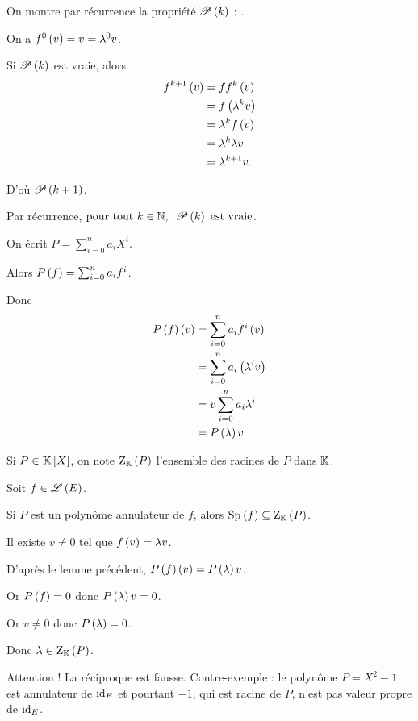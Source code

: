 \begin{dem}
On montre par récurrence la propriété \(\P{k}\) : .

On a \(f^0\paren{v}=v=\lambda^0v\).

Si \(\P{k}\) est vraie, alors \[\begin{aligned}f^{k+1}\paren{v}&=ff^k\paren{v} \\
&=f\paren{\lambda^kv} \\
&=\lambda^kf\paren{v} \\
&=\lambda^k\lambda v \\
&=\lambda^{k+1}v.
\end{aligned}\]

D'où \(\P{k+1}\).

Par récurrence, \(\quantifs{\tpt k\in\N}\P{k}\text{ est vraie}\).

On écrit \(P=\sum_{i=0}^na_iX^i\).

Alors \(P\paren{f}=\sum_{i=0}^na_if^i\).

Donc \[\begin{aligned}
P\paren{f}\paren{v}&=\sum_{i=0}^na_if^i\paren{v} \\
&=\sum_{i=0}^na_i\paren{\lambda^iv} \\
&=v\sum_{i=0}^na_i\lambda^i \\
&=P\paren{\lambda}v.
\end{aligned}\]
\end{dem}

Si \(P\in\poly\), on note \(\rac{P}\) l'ensemble des racines de \(P\) dans \(\K\).

\begin{prop}
Soit \(f\in\Lendo{E}\).

Si \(P\) est un polynôme annulateur de \(f\), alors \(\Sp{f}\subset\rac{P}\).
\end{prop}

\begin{dem}
Il existe \(v\not=0\) tel que \(f\paren{v}=\lambda v\).

D'après le lemme précédent, \(P\paren{f}\paren{v}=P\paren{\lambda}v\).

Or \(P\paren{f}=0\) donc \(P\paren{\lambda}v=0\).

Or \(v\not=0\) donc \(P\paren{\lambda}=0\).

Donc \(\lambda\in\rac{P}\).
\end{dem}

\begin{rem}
Attention ! La réciproque est fausse. Contre-exemple : le polynôme \(P=X^2-1\) est annulateur de \(\id{E}\) et pourtant \(-1\), qui est racine de \(P\), n'est pas valeur propre de \(\id{E}\).
\end{rem}

